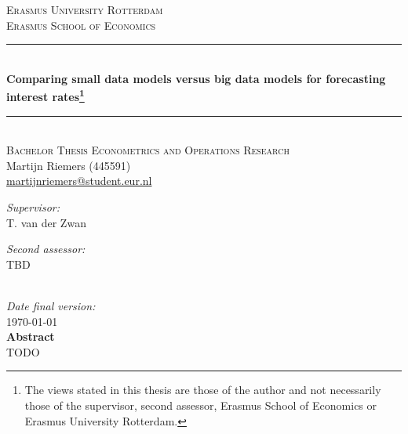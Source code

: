 \begin{titlepage}	
	\begin{center}
		\textsc{\Large{Erasmus University Rotterdam}} \\[.7cm]
		\textsc{Erasmus School of Economics} \\[0.5cm]
		
		\rule{\linewidth}{0.5mm} \\[0.4cm]
		\huge{\bfseries{Comparing small data models versus big data models for forecasting interest rates\footnote{The views stated in this thesis are those of the author and not necessarily those of the supervisor, second assessor, Erasmus School of Economics or Erasmus University Rotterdam.}}} \\
		\rule{\linewidth}{0.5mm} \\[.5cm]
		
		\textsc{\large{Bachelor Thesis Econometrics and Operations Research}} \\[.5cm]
		
		\large{Martijn Riemers (445591)} \\
		\large{\href{mailto:martijnriemers@student.eur.nl}{martijnriemers@student.eur.nl}} \\[.75cm]	
		
		\begin{minipage}[t]{0.4\textwidth}
		\center
		\large{\emph{Supervisor:}}\\
		\large{T. van der Zwan}
		\end{minipage}
		\begin{minipage}[t]{0.4\textwidth}
		\center
		\large{\emph{Second assessor:}} \\
		\large{TBD}
		\end{minipage}\\[.75cm]
		
		\large{\emph{Date final version:}} \\
		\large{\today} \\[3cm]
		
		\textbf{Abstract} \\
		TODO
	\end{center}
\end{titlepage}